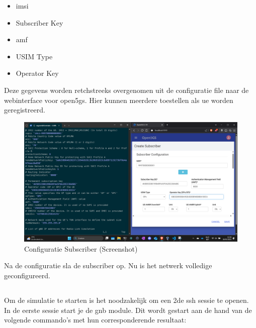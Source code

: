 \begin{itemize}
    \item \gls{imsi}
    \item Subscriber Key
    \item \gls{amf}
    \item USIM Type
    \item Operator Key
\end{itemize}

Deze gegevens worden retchstreeks overgenomen uit de configuratie file naar de webinterface voor \gls{open5gs}. Hier kunnen meerdere toestellen als \gls{ue} worden geregistreerd. 
\begin{figure}[H]
    \includegraphics[width=\linewidth]{../graphics/POC-subConfig.png}
    \caption{Configuratie Subscriber (Screenshot)}
    \label{fig:SubConfig}
\end{figure}

Na de configuratie sla de subscriber op. Nu is het netwerk volledige geconfigureerd. 

\subsection{}%
\label{sec:run}%

Om de simulatie te starten is het noodzakelijk om een 2de ssh sessie te openen.
In de eerste sessie start je de \gls{gnb} module. Dit wordt gestart aan de hand van de volgende commando's met hun corresponderende resultaat:

